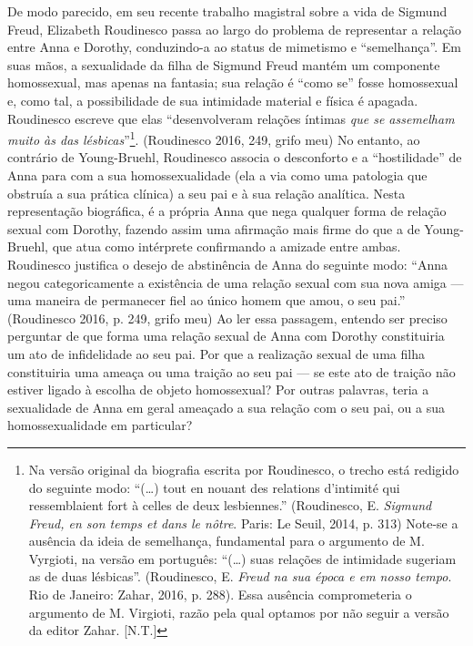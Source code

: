 De modo parecido, em seu recente trabalho magistral sobre a vida de
Sigmund Freud, Elizabeth Roudinesco passa ao largo do problema de
representar a relação entre Anna e Dorothy, conduzindo-a ao status de
mimetismo e ``semelhança''. Em suas mãos, a sexualidade da filha de
Sigmund Freud mantém um componente homossexual, mas apenas na fantasia;
sua relação é ``como se'' fosse homossexual e, como tal, a possibilidade
de sua intimidade material e física é apagada. Roudinesco escreve que
elas ``desenvolveram relações íntimas \emph{que se assemelham muito às
das lésbicas}''\footnote{Na versão original da biografia escrita por
  Roudinesco, o trecho está redigido do seguinte modo: ``(\ldots{}) tout
  en nouant des relations d'intimité qui ressemblaient fort à celles de
  deux lesbiennes.'' (Roudinesco, E. \emph{Sigmund Freud, en son temps
  et dans le nôtre}. Paris: Le Seuil, 2014, p. 313) Note-se a ausência
  da ideia de semelhança, fundamental para o argumento de M. Vyrgioti,
  na versão em português: ``(\ldots{}) suas relações de intimidade
  sugeriam as de duas lésbicas''. (Roudinesco, E. \emph{Freud na sua
  época e em nosso tempo}. Rio de Janeiro: Zahar, 2016, p. 288). Essa
  ausência comprometeria o argumento de M. Virgioti, razão pela qual
  optamos por não seguir a versão da editor Zahar. {[}N.T.{]}}.
(Roudinesco 2016, 249, grifo meu) No entanto, ao contrário de
Young-Bruehl, Roudinesco associa o desconforto e a ``hostilidade'' de Anna
para com a sua homossexualidade (ela a via como uma patologia que
obstruía a sua prática clínica) a seu pai e à sua relação analítica.
Nesta representação biográfica, é a própria Anna que nega qualquer forma
de relação sexual com Dorothy, fazendo assim uma afirmação mais firme do
que a de Young-Bruehl, que atua como intérprete confirmando a amizade
entre ambas. Roudinesco justifica o desejo de abstinência de Anna do
seguinte modo: ``Anna negou categoricamente a existência de uma relação
sexual com sua nova amiga --- uma maneira de permanecer fiel ao único
homem que amou, o seu pai.'' (Roudinesco 2016, p. 249, grifo meu) Ao ler
essa passagem, entendo ser preciso perguntar de que forma uma relação
sexual de Anna com Dorothy constituiria um ato de infidelidade ao seu
pai. Por que a realização sexual de uma filha constituiria uma ameaça ou
uma traição ao seu pai --- se este ato de traição não estiver ligado à
escolha de objeto homossexual? Por outras palavras, teria a sexualidade
de Anna em geral ameaçado a sua relação com o seu pai, ou a sua
homossexualidade em particular?

